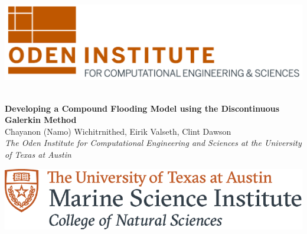 \documentclass[american]{article}
\title{}
\author{}
\date{}
\begin{document}

\begin{center}
  \begin{minipage}{.2\linewidth}
    \includegraphics[width=\linewidth]{media/images/oden-logo-2019.png}
    ~\vfill
    ~\vfill
  \end{minipage}
  \begin{minipage}{.6\linewidth}
    \begin{center}
       \textsf{\textbf{{\fontsize{65}{108}\selectfont  Developing a Compound Flooding Model using the Discontinuous Galerkin Method}}}\\\vspace{1cm}
       \textrm{\fontsize{40}{48}\selectfont Chayanon (Namo) Wichitrnithed, Eirik Valseth, Clint Dawson \\\vspace{5mm} \textit{The Oden Institute for Computational Engineering and Sciences at the University of Texas at Austin} \vspace{5mm} }
    \end{center}
  \end{minipage}
  \hspace{.03\linewidth}
    \begin{minipage}{.16\linewidth}
    \includegraphics[width=\linewidth]{media/images/msi_logo.png}
    ~\vfill
    ~\vfill
  \end{minipage}
\end{center}

\end{document}
